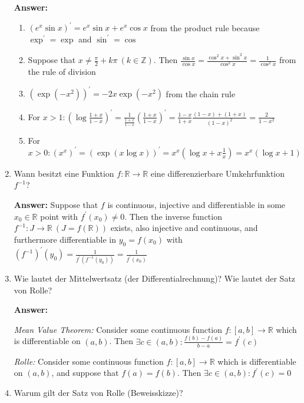 \documentclass[11pt]{article}
\newcommand{\RR}[0]{\mathbb{R}}
\newcommand{\ZZ}[0]{\mathbb{Z}}
\begin{document}
\begin{enumerate}
    \textbf{Answer:}
    \begin{enumerate}
        \item $(e^x \sin{x})^\prime = e^x \sin{x} + e^x \cos{x}$ from the product rule because $\exp^\prime = \exp$ and $\sin^\prime = \cos$
        \item Suppose that $x \neq \frac{\pi}{2} + k\pi~(k \in \ZZ)$. Then $\frac{\sin{x}}{\cos{x}} = \frac{\cos^2{x} + \sin^2{x}}{\cos^2{x}} = \frac{1}{\cos^2{x}}$ from the rule of division
        \item $(\exp(-x^2))^\prime = -2x\exp(-x^2)$ from the chain rule
        \item For $x > 1\colon (\log\frac{1+x}{1-x})^\prime = \frac{1}{\frac{1+x}{1-x}} (\frac{1+x}{1-x})^\prime = \frac{1-x}{1+x} \frac{(1-x) + (1+x)}{(1-x)^2}=\frac{2}{1-x^2}$
        \item For $x > 0\colon (x^x)^\prime = (\exp(x \log{x}))^\prime = x^x (\log{x} + x\frac{1}{x}) = x^x (\log{x} + 1)$
    \end{enumerate}

    \item Wann besitzt eine Funktion $f\colon \RR\to\RR$ eine differenzierbare Umkehrfunktion $f^{-1}$?
    
    \textbf{Answer:} Suppose that $f$ is continuous, injective and differentiable in some $x_0 \in \RR$ point with $f^\prime(x_0) \neq 0$. Then the inverse function  $f^{-1}\colon J \to \RR~(J = f(\RR))$ exists, also injective and continuous, and furthermore differentiable in $y_0 = f(x_0)$ with $(f^{-1})^\prime(y_0) = \frac{1}{f^\prime(f^{-1}(y_0))} = \frac{1}{f^\prime(x_0)}$

    \item Wie lautet der Mittelwertsatz (der Differentialrechnung)? Wie lautet der Satz von
    Rolle?

    \textbf{Answer:}

    \textit{Mean Value Theorem:} Consider some continuous function $f\colon [a, b] \to \RR$ which is differentiable on $(a, b)$. Then $\exists c \in (a, b)\colon \frac{f(b) - f(a)}{b - a} = f^\prime(c)$

    \textit{Rolle:} Consider some continuous function $f\colon [a, b] \to \RR$ which is differentiable on $(a, b)$, and suppose that $f(a) = f(b)$. Then $\exists c\in(a, b)\colon f^\prime(c) = 0$

    \item Warum gilt der Satz von Rolle (Beweisskizze)?
    

\end{enumerate}
\end{document}
